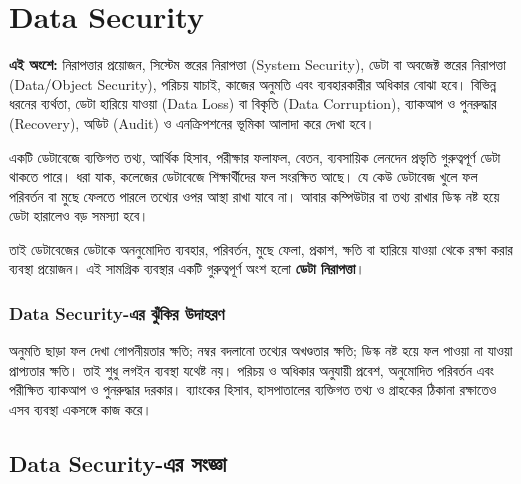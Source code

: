 %

\section{Data Security}
\label{sec:ch06-data-security}

\textbf{এই অংশে:} নিরাপত্তার প্রয়োজন, সিস্টেম স্তরের নিরাপত্তা (System Security), ডেটা বা অবজেক্ট স্তরের নিরাপত্তা (Data/Object Security), পরিচয় যাচাই, কাজের অনুমতি এবং ব্যবহারকারীর অধিকার বোঝা হবে। বিভিন্ন ধরনের ব্যর্থতা, ডেটা হারিয়ে যাওয়া (Data Loss) বা বিকৃতি (Data Corruption), ব্যাকআপ ও পুনরুদ্ধার (Recovery), অডিট (Audit) ও এনক্রিপশনের ভূমিকা আলাদা করে দেখা হবে।


একটি ডেটাবেজে ব্যক্তিগত তথ্য, আর্থিক হিসাব, পরীক্ষার ফলাফল,
বেতন, ব্যবসায়িক লেনদেন প্রভৃতি গুরুত্বপূর্ণ ডেটা থাকতে পারে।
ধরা যাক, কলেজের ডেটাবেজে শিক্ষার্থীদের ফল সংরক্ষিত আছে। যে কেউ ডেটাবেজ খুলে ফল পরিবর্তন বা মুছে ফেলতে পারলে তথ্যের ওপর আস্থা রাখা যাবে না। আবার কম্পিউটার বা তথ্য রাখার ডিস্ক নষ্ট হয়ে ডেটা হারালেও বড় সমস্যা হবে।

তাই ডেটাবেজের ডেটাকে অননুমোদিত ব্যবহার, পরিবর্তন, মুছে ফেলা,
প্রকাশ, ক্ষতি বা হারিয়ে যাওয়া থেকে রক্ষা করার ব্যবস্থা প্রয়োজন।
এই সামগ্রিক ব্যবস্থার একটি গুরুত্বপূর্ণ অংশ হলো
\textbf{ডেটা নিরাপত্তা}।




\subsubsection{Data Security-এর ঝুঁকির উদাহরণ}
অনুমতি ছাড়া ফল দেখা গোপনীয়তার ক্ষতি; নম্বর বদলানো তথ্যের অখণ্ডতার ক্ষতি; ডিস্ক নষ্ট হয়ে ফল পাওয়া না যাওয়া প্রাপ্যতার ক্ষতি। তাই শুধু লগইন ব্যবস্থা যথেষ্ট নয়। পরিচয় ও অধিকার অনুযায়ী প্রবেশ, অনুমোদিত পরিবর্তন এবং পরীক্ষিত ব্যাকআপ ও পুনরুদ্ধার দরকার। ব্যাংকের হিসাব, হাসপাতালের ব্যক্তিগত তথ্য ও গ্রাহকের ঠিকানা রক্ষাতেও এসব ব্যবস্থা একসঙ্গে কাজ করে।

\subsection{Data Security-এর সংজ্ঞা}

